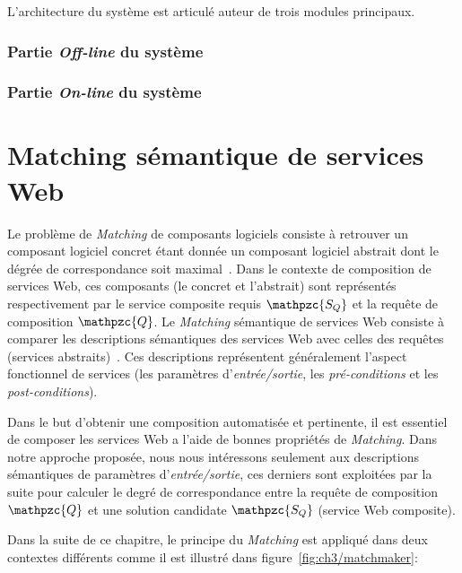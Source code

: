 L'architecture du système est articulé auteur de trois modules
principaux.
\subsubsection{Partie \emph{Off-line} du système}
\label{sec:presentation-architecture-online}

\subsubsection{Partie \emph{On-line} du système}
\label{sec:presentation-architecture-online}

\newpage
\section{Matching sémantique de services Web}
\label{sec:ch3/matching}

Le problème de \emph{Matching} de composants logiciels consiste à
retrouver un composant logiciel concret étant donnée un composant
logiciel abstrait dont le dégrée de correspondance soit
maximal~\cite{lecue2008composition}. Dans le contexte de composition
de services Web, ces composants (le concret et l'abstrait) sont
représentés respectivement par le service composite requis {\large
  $\mathpzc{S_Q}$} et la requête de composition {\large
  $\mathpzc{Q}$}. Le \emph{Matching} sémantique de services Web
consiste à comparer les descriptions sémantiques des services Web avec
celles des requêtes (services
abstraits)~\cite{paolucci2002semantic}. Ces descriptions représentent
généralement l'aspect fonctionnel de services (les paramètres
d'\emph{entrée/sortie}, les \emph{pré-conditions} et les
\emph{post-conditions}).\medskip

Dans le but d'obtenir une composition automatisée et pertinente, il
est essentiel de composer les services Web a l'aide de bonnes
propriétés de \emph{Matching}. Dans notre approche proposée, nous nous
intéressons seulement aux descriptions sémantiques de paramètres
d'\emph{entrée/sortie}, ces derniers sont exploitées par la suite pour
calculer le degré de correspondance entre la requête de composition
{\large $\mathpzc{Q}$} et une solution candidate {\large
  $\mathpzc{S_Q}$} (service Web composite).\medskip

Dans la suite de ce chapitre, le principe du \emph{Matching} est
appliqué dans deux contextes différents comme il est illustré dans
figure~\ref{fig:ch3/matchmaker}:



